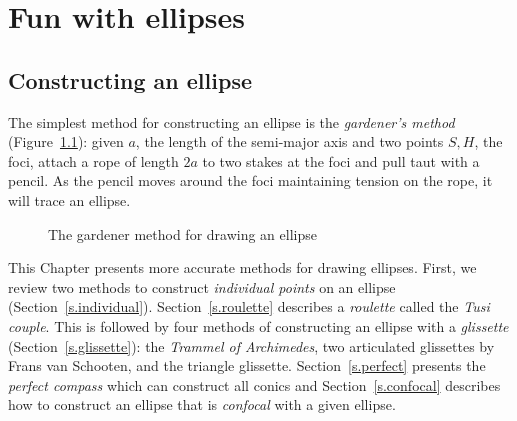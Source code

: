 \part{Fun with ellipses}


\chapter{Constructing an ellipse}\label{s.constructing}

The simplest method for constructing an ellipse is the \emph{gardener's method} (Figure~\ref{f.gardener}): given $a$, the length of the semi-major axis and two points $S,H$, the foci, attach a rope of length $2a$ to two stakes at the foci and pull taut with a pencil. As the pencil moves around the foci maintaining tension on the rope, it will trace an ellipse.


\begin{figure}[b]
\begin{center}
\caption{The gardener method for drawing an ellipse}\label{f.gardener}
\end{center}
\end{figure}


This Chapter presents more accurate methods for drawing ellipses. First, we review two methods to construct \emph{individual points} on an ellipse (Section~\ref{s.individual}).  Section~\ref{s.roulette} describes a \emph{roulette} called the \emph{Tusi couple}. This is followed by four methods of constructing an ellipse with a \emph{glissette} (Section~\ref{s.glissette}): the \emph{Trammel of Archimedes}, two articulated glissettes by Frans van Schooten, and the triangle glissette. Section~\ref{s.perfect} presents the \emph{perfect compass} which can construct all conics and Section~\ref{s.confocal} describes how to construct an ellipse that is \emph{confocal} with a given ellipse.

